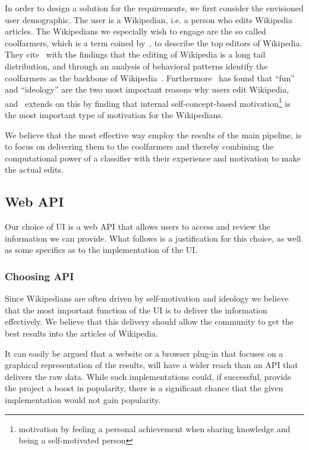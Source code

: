 In order to design a solution for the requirements, we first consider the envisioned user demographic. The user is a Wikipedian, i.e. a person who edits Wikipedia articles. The Wikipedians we especially wish to engage are the so called coolfarmers, which is a term coined by~\cite{coolfarming}, to describe the top editors of Wikipedia. They cite~\cite{Priedhorsky:2007:CDR:1316624.1316663} with the findings that the editing of Wikipedia is a long tail distribution, and through an analysis of behavioral patterns identify the coolfarmers as the backbone of Wikipedia~\cite{coolfarming}. Furthermore~\cite{wiki_motivation} has found that \enquote{fun} and \enquote{ideology} are the two most important reasons why users edit Wikipedia, and~\cite{Yang20101377} extends on this by finding that internal self-concept-based motivation\footnote{motivation by feeling a personal achievement when sharing knowledge and being a self-motivated person} is the most important type of motivation for the Wikipedians.

We believe that the most effective way employ the results of the main pipeline, is to focus on delivering them to the coolfarmers and thereby combining the computational power of a classifier with their experience and motivation to make the actual edits.


\subsection{Web API}

Our choice of UI is a web API that allows users to access and review the information we can provide. What follows is a justification for this choice, as well as some specifics as to the implementation of the UI.

\subsubsection{Choosing API}
Since Wikipedians are often driven by self-motivation and ideology we believe that the most important function of the UI is to deliver the information effectively. We believe that this delivery should allow the community to get the best results into the articles of Wikipedia.

It can easily be argued that a website or a browser plug-in that focuses on a graphical representation of the results, will have a wider reach than an API that delivers the raw data. While such implementations could, if successful, provide the project a boost in popularity, there is a significant chance that the given implementation would not gain popularity.

